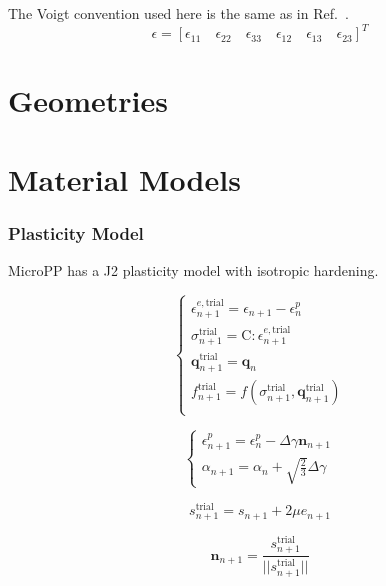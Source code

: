 \documentclass[conference, onecolumn]{IEEEtran}
\begin{document}
The Voigt convention used here is the same as in Ref.~\cite{simo}.
\begin{equation}
\epsilon = \left[\epsilon_{11} \quad \epsilon_{22} \quad \epsilon_{33} \quad \epsilon_{12} \quad \epsilon_{13} \quad \epsilon_{23} \right]^T
\end{equation}

\section{Geometries}

\section{Material Models}

\subsubsection{Plasticity Model}

MicroPP has a J2 plasticity model with isotropic hardening.

\begin {equation}
\left\{
\begin{array}{ll}
\epsilon_{n+1}^{e,\text{trial}} = \epsilon_{n+1} - \epsilon_{n}^{p} \\[5pt]
\sigma_{n+1}^{\text{trial}} = \mathrm{C} : \epsilon_{n+1}^{e,\text{trial}} \\[5pt]
\mathbf{q}_{n+1}^{\text{trial}} = \mathbf{q}_{n} \\[5pt]
f_{n+1}^{\text{trial}} = f (\sigma_{n+1}^{\text{trial}}, \mathbf{q}_{n+1}^{\text{trial}})\\
\end{array}
\right.
\end {equation}

\begin {equation}
\left\{
\begin{array}{ll}
\epsilon_{n+1}^{p} = \epsilon_{n}^{p} - \Delta \gamma  \mathbf{n}_{n+1} \\[5pt]
\alpha_{n+1} = \alpha_{n} + \sqrt{\frac{2}{3}} \Delta \gamma
\end{array}
\right.
\end {equation}

\begin {equation}
s_{n+1}^{\text{trial}} = s_{n+1} + 2 \mu e_{n+1}
\end {equation}

\begin {equation}
\mathbf{n}_{n+1} = \frac{s_{n+1}^{\text{trial}}}{|| s_{n+1}^{\text{trial}} ||}
\end {equation}
\end{document}
